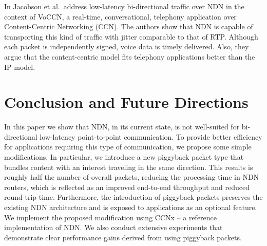 \documentclass[conference]{IEEEtran}
\begin{document}
In \cite{voccn} Jacobson et al.~address low-latency bi-directional traffic over NDN in the context of VoCCN, a real-time, conversational, telephony application over Content-Centric Networking (CCN). The authors show that NDN is capable of transporting this kind of traffic with jitter comparable to that of RTP. Although each packet is independently signed, voice data is timely delivered. Also, they argue that the content-centric model fits telephony applications better than the IP model. 


\section{Conclusion and Future Directions}
\label{sec:conclusion}
In this paper we show that NDN, in its current state, is not well-suited for 
bi-directional low-latency point-to-point communication.  To provide better
efficiency for applications requiring this type of communication, we propose
some simple modifications. In particular, we introduce a new piggyback
packet type that bundles content with an interest traveling in the same direction. 
This results is roughly half the number of overall packets,  reducing the processing time in NDN routers,
which is reflected as an improved end-to-end throughput and reduced round-trip time.
Furthermore, the introduction of piggyback packets 
preserves the existing NDN architecture and is exposed to applications as an optional feature. We implement the proposed modification 
using CCNx -- a reference implementation of NDN. We also conduct extensive experiments 
that demonstrate
clear performance gains derived from using piggyback packets.
\end{document}
